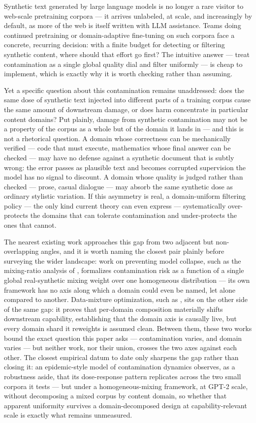 \documentclass[11pt]{article}
\begin{document}
Synthetic text generated by large language models is no longer a rare visitor to web-scale pretraining corpora --- it arrives unlabeled, at scale, and increasingly by default, as more of the web is itself written with LLM assistance. Teams doing continued pretraining or domain-adaptive fine-tuning on such corpora face a concrete, recurring decision: with a finite budget for detecting or filtering synthetic content, where should that effort go first? The intuitive answer --- treat contamination as a single global quality dial and filter uniformly --- is cheap to implement, which is exactly why it is worth checking rather than assuming.

Yet a specific question about this contamination remains unaddressed: does the same dose of synthetic text injected into different parts of a training corpus cause the same amount of downstream damage, or does harm concentrate in particular content domains? Put plainly, damage from synthetic contamination may not be a property of the corpus as a whole but of the domain it lands in --- and this is not a rhetorical question. A domain whose correctness can be mechanically verified --- code that must execute, mathematics whose final answer can be checked --- may have no defense against a synthetic document that is subtly wrong: the error passes as plausible text and becomes corrupted supervision the model has no signal to discount. A domain whose quality is judged rather than checked --- prose, casual dialogue --- may absorb the same synthetic dose as ordinary stylistic variation. If this asymmetry is real, a domain-uniform filtering policy --- the only kind current theory can even express --- systematically over-protects the domains that can tolerate contamination and under-protects the ones that cannot.

The nearest existing work approaches this gap from two adjacent but non-overlapping angles, and it is worth naming the closest pair plainly before surveying the wider landscape: work on preventing model collapse, such as the mixing-ratio analysis of \citet{MixRatio2023}, formalizes contamination risk as a function of a single global real-synthetic mixing weight over one homogeneous distribution --- its own framework has no axis along which a domain could even be named, let alone compared to another. Data-mixture optimization, such as \citet{DoReMi2023}, sits on the other side of the same gap: it proves that per-domain composition materially shifts downstream capability, establishing that the domain axis is causally live, but every domain shard it reweights is assumed clean. Between them, these two works bound the exact question this paper asks --- contamination varies, and domain varies --- but neither work, nor their union, crosses the two axes against each other. The closest empirical datum to date only sharpens the gap rather than closing it: an epidemic-style model of contamination dynamics \citep{EpidemiologyCollapse2026} observes, as a robustness aside, that its dose-response pattern replicates across the two small corpora it tests --- but under a homogeneous-mixing framework, at GPT-2 scale, without decomposing a mixed corpus by content domain, so whether that apparent uniformity survives a domain-decomposed design at capability-relevant scale is exactly what remains unmeasured.
\end{document}
